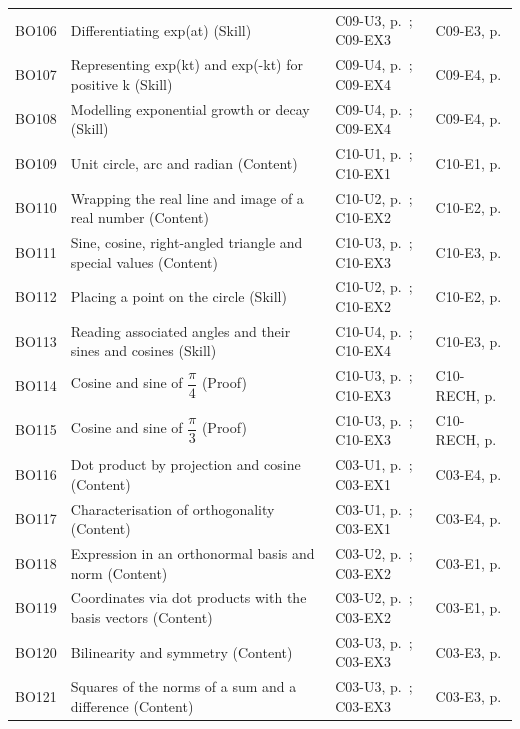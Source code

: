 \begin{longtable}{p{.1\linewidth}p{.43\linewidth}p{.19\linewidth}p{.16\linewidth}}
BO106 & Differentiating exp(at) (Skill) & C09-U3, p.\,\pageref{C09-U3} ; C09-EX3 & C09-E3, p.\,\pageref{C09-E3} \\
BO107 & Representing exp(kt) and exp(-kt) for positive k (Skill) & C09-U4, p.\,\pageref{C09-U4} ; C09-EX4 & C09-E4, p.\,\pageref{C09-E4} \\
BO108 & Modelling exponential growth or decay (Skill) & C09-U4, p.\,\pageref{C09-U4} ; C09-EX4 & C09-E4, p.\,\pageref{C09-E4} \\
BO109 & Unit circle, arc and radian (Content) & C10-U1, p.\,\pageref{C10-U1} ; C10-EX1 & C10-E1, p.\,\pageref{C10-E1} \\
BO110 & Wrapping the real line and image of a real number (Content) & C10-U2, p.\,\pageref{C10-U2} ; C10-EX2 & C10-E2, p.\,\pageref{C10-E2} \\
BO111 & Sine, cosine, right-angled triangle and special values (Content) & C10-U3, p.\,\pageref{C10-U3} ; C10-EX3 & C10-E3, p.\,\pageref{C10-E3} \\
BO112 & Placing a point on the circle (Skill) & C10-U2, p.\,\pageref{C10-U2} ; C10-EX2 & C10-E2, p.\,\pageref{C10-E2} \\
BO113 & Reading associated angles and their sines and cosines (Skill) & C10-U4, p.\,\pageref{C10-U4} ; C10-EX4 & C10-E3, p.\,\pageref{C10-E3} \\
BO114 & Cosine and sine of $\dfrac{\pi}{4}$ (Proof) & C10-U3, p.\,\pageref{C10-U3} ; C10-EX3 & C10-RECH, p.\,\pageref{C10-RECH} \\
BO115 & Cosine and sine of $\dfrac{\pi}{3}$ (Proof) & C10-U3, p.\,\pageref{C10-U3} ; C10-EX3 & C10-RECH, p.\,\pageref{C10-RECH} \\
BO116 & Dot product by projection and cosine (Content) & C03-U1, p.\,\pageref{C03-U1} ; C03-EX1 & C03-E4, p.\,\pageref{C03-E4} \\
BO117 & Characterisation of orthogonality (Content) & C03-U1, p.\,\pageref{C03-U1} ; C03-EX1 & C03-E4, p.\,\pageref{C03-E4} \\
BO118 & Expression in an orthonormal basis and norm (Content) & C03-U2, p.\,\pageref{C03-U2} ; C03-EX2 & C03-E1, p.\,\pageref{C03-E1} \\
BO119 & Coordinates via dot products with the basis vectors (Content) & C03-U2, p.\,\pageref{C03-U2} ; C03-EX2 & C03-E1, p.\,\pageref{C03-E1} \\
BO120 & Bilinearity and symmetry (Content) & C03-U3, p.\,\pageref{C03-U3} ; C03-EX3 & C03-E3, p.\,\pageref{C03-E3} \\
BO121 & Squares of the norms of a sum and a difference (Content) & C03-U3, p.\,\pageref{C03-U3} ; C03-EX3 & C03-E3, p.\,\pageref{C03-E3} \\

\end{longtable}

